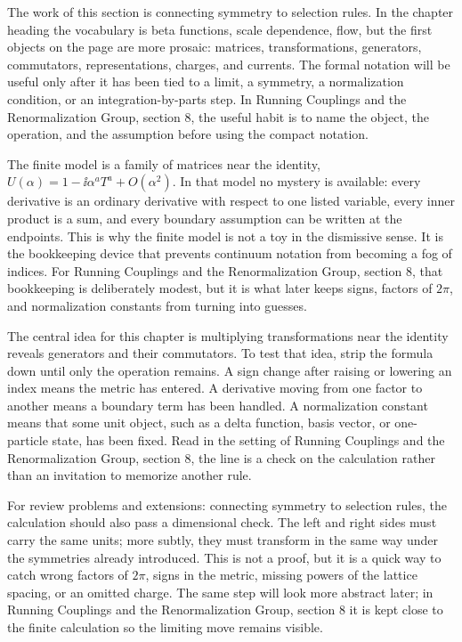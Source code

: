 The work of this section is connecting symmetry to selection rules.  In the chapter heading the vocabulary is beta functions, scale dependence, flow, but the first objects on the page are more prosaic: matrices, transformations, generators, commutators, representations, charges, and currents.  The formal notation will be useful only after it has been tied to a limit, a symmetry, a normalization condition, or an integration-by-parts step.  In Running Couplings and the Renormalization Group, section 8, the useful habit is to name the object, the operation, and the assumption before using the compact notation.

The finite model is a family of matrices near the identity, \(U(\alpha)=1-\ii\alpha^aT^a+O(\alpha^2)\).  In that model no mystery is available: every derivative is an ordinary derivative with respect to one listed variable, every inner product is a sum, and every boundary assumption can be written at the endpoints.  This is why the finite model is not a toy in the dismissive sense.  It is the bookkeeping device that prevents continuum notation from becoming a fog of indices.  For Running Couplings and the Renormalization Group, section 8, that bookkeeping is deliberately modest, but it is what later keeps signs, factors of \(2\pi\), and normalization constants from turning into guesses.

The central idea for this chapter is multiplying transformations near the identity reveals generators and their commutators.  To test that idea, strip the formula down until only the operation remains.  A sign change after raising or lowering an index means the metric has entered.  A derivative moving from one factor to another means a boundary term has been handled.  A normalization constant means that some unit object, such as a delta function, basis vector, or one-particle state, has been fixed.  Read in the setting of Running Couplings and the Renormalization Group, section 8, the line is a check on the calculation rather than an invitation to memorize another rule.

For review problems and extensions: connecting symmetry to selection rules, the calculation should also pass a dimensional check.  The left and right sides must carry the same units; more subtly, they must transform in the same way under the symmetries already introduced.  This is not a proof, but it is a quick way to catch wrong factors of \(2\pi\), signs in the metric, missing powers of the lattice spacing, or an omitted charge.  The same step will look more abstract later; in Running Couplings and the Renormalization Group, section 8 it is kept close to the finite calculation so the limiting move remains visible.


